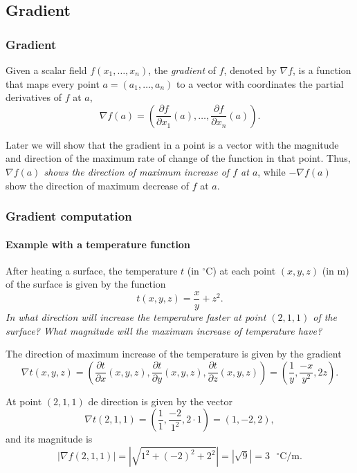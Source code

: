 \subsection{Gradient}
\begin{frame}
\frametitle{Gradient}
\begin{definition}[Gradient]
Given a scalar field $f(x_1,\ldots,x_n)$, the \emph{gradient} of $f$, denoted by $\nabla f$, is a function that maps every point
$a=(a_1,\ldots,a_n)$ to a vector with coordinates the partial derivatives of $f$ at $a$,
\[
\nabla f(a)=\left(\frac{\partial f}{\partial x_1}(a),\ldots,\frac{\partial f}{\partial x_n}(a)\right).
\]
\end{definition}

Later we will show that the gradient in a point is a vector with the magnitude and direction of the maximum rate of change of the function in that point.
Thus, \alert{\emph{$\nabla f(a)$ shows the direction of maximum increase of $f$ at $a$}}, while $-\nabla f(a)$ show the direction of maximum decrease of $f$ at $a$.
\end{frame}



\begin{frame}
\frametitle{Gradient computation}
\framesubtitle{Example with a temperature function}

After heating a surface, the temperature $t$ (in $^\circ$C) at each point $(x,y,z)$ (in m) of the surface is given by the function
\[
t(x,y,z)=\frac{x}{y}+z^2.
\]
\emph{In what direction will increase the temperature faster at point $(2,1,1)$ of the surface?
What magnitude will the maximum increase of temperature have?}

The direction of maximum increase of the temperature is given by the gradient
\[
\nabla t(x,y,z)=\left(\frac{\partial t}{\partial x}(x,y,z),\frac{\partial t}{\partial y}(x,y,z),\frac{\partial t}{\partial
z}(x,y,z)\right)=\left(\frac{1}{y},\frac{-x}{y^2},2z\right).
\]

At point $(2,1,1)$ de direction is given by the vector
\[
\nabla t(2,1,1)=\left(\frac{1}{1},\frac{-2}{1^2},2\cdot 1\right)=(1,-2,2),
\]
and its magnitude is
\[
|\nabla f(2,1,1)|=|\sqrt{1^2+(-2)^2+2^2}|=|\sqrt{9}|=3 \mbox{ $^\circ$C/m}.
\]
\end{frame}



